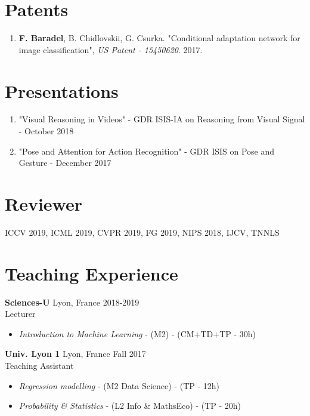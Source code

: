 \documentclass[10pt]{res} %
\begin{document}
\begin{resume}
\section{\large Patents}
\begin{enumerate}[wide=0pt]
	\item \textbf{F. Baradel}, B. Chidlovskii, G. Csurka. "Conditional adaptation network for image classification",  \textit{US Patent - 15450620}. 2017.
\end{enumerate}

\section{\large Presentations}
\begin{enumerate}[wide=0pt]
	\item "Visual Reasoning in Videos" - GDR ISIS-IA on Reasoning from Visual Signal - October 2018
	\item "Pose and Attention for Action Recognition" - GDR ISIS on Pose and Gesture - December 2017
\end{enumerate}

\section{\large Reviewer}  
ICCV 2019, ICML 2019, CVPR 2019, FG 2019, NIPS 2018, IJCV, TNNLS

\section{\large Teaching Experience}
\textbf{Sciences-U} \hfill Lyon, France \hfill 2018-2019 \\
Lecturer
\begin{itemize}
	\item \textit{Introduction to Machine Learning} - (M2) - (CM+TD+TP - 30h)
\end{itemize}

\textbf{Univ. Lyon 1} \hfill Lyon, France \hfill Fall 2017 \\
Teaching Assistant
\begin{itemize}
	\item \textit{Regression modelling}  - (M2 Data Science) - (TP - 12h)
	\item \textit{Probability \& Statistics}  - (L2 Info \& MathsEco) - (TP - 20h)
\end{itemize}


\end{resume}
\end{document}
